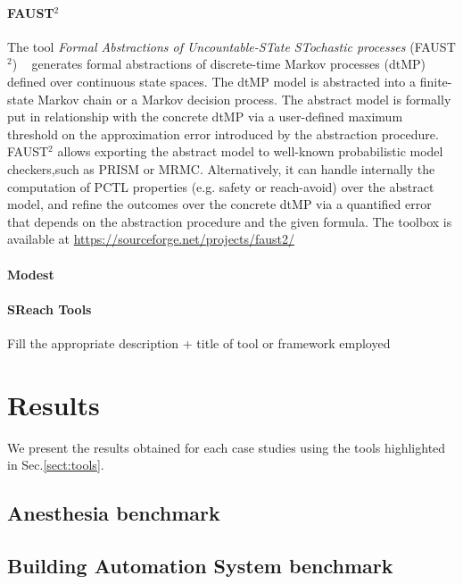 \documentclass[EPiC]{easychair}
\newcommand{\todo}[1]{
  \begin{framed}
    \noindent{\bf TODO: }
    #1
  \end{framed}
}
\begin{document}
\paragraph{FAUST$^2$}
The tool \textit{Formal Abstractions of Uncountable-STate STochastic
processes} (FAUST$^2$) ~\cite{soudjani2015faust} generates formal abstractions of discrete-time Markov processes (dtMP) defined over continuous state spaces. The dtMP model is abstracted into a finite-state Markov chain or a Markov decision process. The abstract model is formally put in relationship with the concrete dtMP via a user-defined maximum threshold on the approximation error introduced by the abstraction procedure. FAUST$^2$ allows exporting the abstract model to well-known probabilistic model checkers,such as PRISM or MRMC. Alternatively, it can handle internally the computation of PCTL properties (e.g. safety or reach-avoid) over the abstract model, and refine the outcomes over the concrete dtMP via a quantified error that depends on the abstraction procedure and the given formula. The toolbox is available at \url{https://sourceforge.net/projects/faust2/}\\

\paragraph{Modest}

\paragraph{SReach Tools}


\todo{ Fill the appropriate description + title of tool or framework employed}
\section{Results}
\label{sect:results}

We present the results obtained for each case studies using the tools highlighted in Sec.\ref{sect:tools}.

\subsection{Anesthesia benchmark}
\newpage

\subsection{Building Automation System benchmark}
\end{document}
